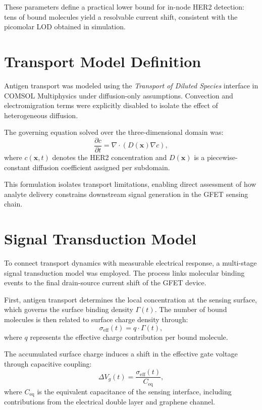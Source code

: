 \documentclass[12pt,a4paper]{report}
\begin{document}
\noindent
These parameters define a practical lower bound for in-node HER2 detection:
tens of bound molecules yield a resolvable current shift, consistent with the
picomolar LOD obtained in simulation.

\section{Transport Model Definition}

Antigen transport was modeled using the \textit{Transport of Diluted Species} interface in COMSOL Multiphysics under diffusion-only assumptions. Convection and electromigration terms were explicitly disabled to isolate the effect of heterogeneous diffusion.

The governing equation solved over the three-dimensional domain was:
\begin{equation}
\frac{\partial c}{\partial t}
= \nabla \cdot \left( D(\mathbf{x}) \nabla c \right),
\end{equation}
where $c(\mathbf{x},t)$ denotes the HER2 concentration and $D(\mathbf{x})$ is a piecewise-constant diffusion coefficient assigned per subdomain.

This formulation isolates transport limitations, enabling direct assessment of how analyte delivery constrains downstream signal generation in the GFET sensing chain.

\section{Signal Transduction Model}

To connect transport dynamics with measurable electrical response, a multi-stage signal transduction model was employed. The process links molecular binding events to the final drain-source current shift of the GFET device.

First, antigen transport determines the local concentration at the sensing surface, which governs the surface binding density $\Gamma(t)$. The number of bound molecules is then related to surface charge density through:
\begin{equation}
\sigma_{\text{eff}}(t) = q \cdot \Gamma(t),
\end{equation}
where $q$ represents the effective charge contribution per bound molecule.

The accumulated surface charge induces a shift in the effective gate voltage through capacitive coupling:
\begin{equation}
\Delta V_g(t) = \frac{\sigma_{\text{eff}}(t)}{C_{\text{eq}}},
\end{equation}
where $C_{\text{eq}}$ is the equivalent capacitance of the sensing interface, including contributions from the electrical double layer and graphene channel.
\end{document}
